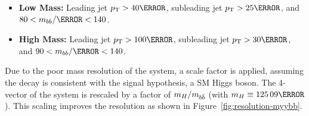\begin{itemize}
  \item \textbf{Low Mass:} Leading jet $\pt > \unit{40}{\GeV}$, subleading jet $\pt > \unit{25}{\GeV}$, and $80 < m_{bb}/\GeV < 140$.
  \item \textbf{High Mass:} Leading jet $\pt > \unit{100}{\GeV}$, subleading jet $\pt > \unit{30}{\GeV}$, and $90 < m_{bb}/\GeV < 140$.
\end{itemize}

Due to the poor mass resolution of the \bb system, a scale factor is applied, assuming the decay is consistent with the signal hypothesis, a \gls{SM} Higgs boson. The 4-vector of the system is rescaled by a factor of $m_{H}/m_{b\bar{b}}$ (with $m_H \equiv \unit{125.09}{\GeV}$). This scaling improves the \myybb resolution as shown in Figure~\ref{fig:resolution-myybb}.


